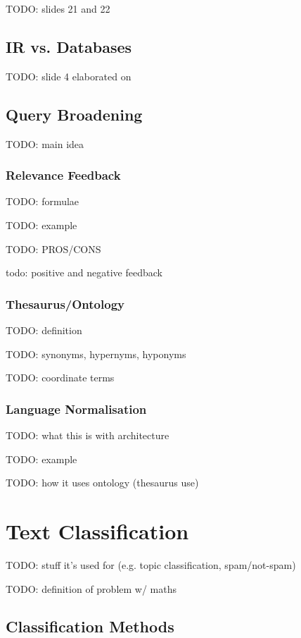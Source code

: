 \documentclass{article}
\begin{document}
TODO: slides 21 and 22

\subsection{IR vs. Databases}

TODO: slide 4 elaborated on

\subsection{Query Broadening}

TODO: main idea

\subsubsection{Relevance Feedback}

TODO: formulae

TODO: example

TODO: PROS/CONS

todo: positive and negative feedback

\subsubsection{Thesaurus/Ontology}

TODO: definition

TODO: synonyms, hypernyms, hyponyms

TODO: coordinate terms

\subsubsection{Language Normalisation}

TODO: what this is with architecture

TODO: example

TODO: how it uses ontology (thesaurus use)

\section{Text Classification}

TODO: stuff it's used for (e.g. topic classification, spam/not-spam)

TODO: definition of problem w/ maths

\subsection{Classification Methods}
\end{document}
